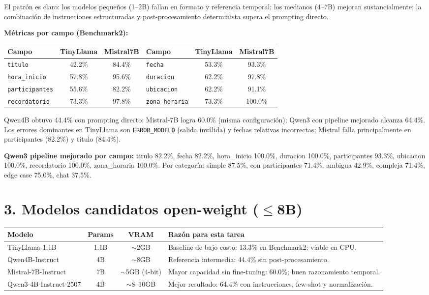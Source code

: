 \documentclass[10pt,a4paper]{article}
\begin{document}
El patr\'on es claro: los modelos peque\~nos (1--2B) fallan en formato y referencia temporal; los medianos (4--7B) mejoran sustancialmente; la combinaci\'on de instrucciones estructuradas y post-procesamiento determinista supera el prompting directo.

\textbf{M\'etricas por campo (Benchmark2):}
\begin{center}
\scriptsize
\begin{tabular}{@{}lcc@{\quad}lcc@{}}
\toprule
Campo & TinyLlama & Mistral7B & Campo & TinyLlama & Mistral7B \\
\midrule
\texttt{titulo} & 42.2\% & 84.4\% & \texttt{fecha} & 53.3\% & 93.3\% \\
\texttt{hora\_inicio} & 57.8\% & 95.6\% & \texttt{duracion} & 62.2\% & 97.8\% \\
\texttt{participantes} & 55.6\% & 82.2\% & \texttt{ubicacion} & 62.2\% & 91.1\% \\
\texttt{recordatorio} & 73.3\% & 97.8\% & \texttt{zona\_horaria} & 73.3\% & 100.0\% \\
\bottomrule
\end{tabular}
\end{center}

Qwen4B obtuvo 44.4\% con prompting directo; Mistral-7B logra 60.0\% (misma configuraci\'on); Qwen3 con pipeline mejorado alcanza 64.4\%. Los errores dominantes en TinyLlama son \texttt{ERROR\_MODELO} (salida inv\'alida) y fechas relativas incorrectas; Mistral falla principalmente en participantes (82.2\%) y t\'itulo (84.4\%).

\textbf{Qwen3 pipeline mejorado por campo:} titulo 82.2\%, fecha 82.2\%, hora\_inicio 100.0\%, duracion 100.0\%, participantes 93.3\%, ubicacion 100.0\%, recordatorio 100.0\%, zona\_horaria 100.0\%. Por categor\'ia: simple 87.5\%, con participantes 71.4\%, ambigua 42.9\%, compleja 71.4\%, edge case 75.0\%, chat 37.5\%.

\section*{3. Modelos candidatos open-weight ($\leq$8B)}
\begin{center}
\scriptsize
\begin{tabularx}{\textwidth}{@{}>{\raggedright\arraybackslash}p{2.55cm} c c X@{}}
\toprule
\textbf{Modelo} & \textbf{Params} & \textbf{VRAM} & \textbf{Raz\'on para esta tarea} \\
\midrule
TinyLlama-1.1B & 1.1B & $\sim$2GB & Baseline de bajo costo: 13.3\% en Benchmark2; viable en CPU. \\
Qwen4B-Instruct & 4B & $\sim$8GB & Referencia intermedia: 44.4\% sin post-procesamiento. \\
Mistral-7B-Instruct & 7B & $\sim$5GB (4-bit) & Mayor capacidad sin fine-tuning: 60.0\%; buen razonamiento temporal. \\
\rowcolor{pale}
Qwen3-4B-Instruct-2507 & 4B & $\sim$8--10GB & Mejor resultado: 64.4\% con instrucciones, few-shot y normalizaci\'on. \\
\bottomrule
\end{tabularx}
\end{center}
\end{document}
